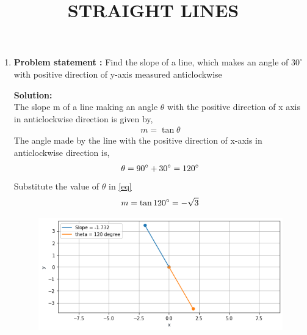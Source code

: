 \documentclass[12pt]{article}
\newcommand{\solution}{\noindent \textbf{Solution: }}
\begin{document}
\begin{center}
\title{\textbf{STRAIGHT LINES}}
\maketitle
\end{center}
\begin{enumerate}
\item\textbf{Problem statement :} Find the slope of a line, which makes an angle of $30^\circ$ with positive direction of y-axis measured anticlockwise

\solution
\\
The slope m of a line making an angle $\theta$ with the positive direction of x axis in anticlockwise direction is given by,
\begin{align}
    m=\tan\theta
    \label{eq}
\end{align}
The angle made by the line with the positive direction of x-axis in anticlockwise direction is,
\begin{align}
    \theta=90\degree + 30\degree=120\degree
\end{align}
Substitute the value of $\theta$ in \eqref{eq}
\begin{align}
        m=\tan120\degree = -\sqrt{3}
\end{align}
\begin{figure}[!h]
 \begin{center}
  \includegraphics[width=\columnwidth]{figs/fig.png}
 \end{center}
\caption{}
\label{fig:Fig1}
\end{figure}
\end{enumerate}
\end{document}
